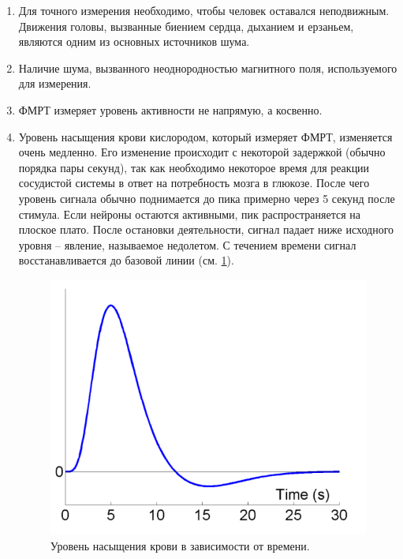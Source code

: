 \documentclass[pdftex,ptm,12pt,a4paper]{report}
\theoremstyle{definition}
\begin{document}
\begin{enumerate}
\item Для точного измерения необходимо, чтобы человек оставался неподвижным. Движения головы, вызванные биением сердца, дыханием и  ерзаньем, являются одним из основных источников шума.

\item Наличие шума, вызванного неоднородностью магнитного поля, используемого для измерения.

\item ФМРТ измеряет уровень активности не напрямую, а косвенно.

\item Уровень насыщения крови кислородом, который измеряет ФМРТ, изменяется очень медленно. Его изменение происходит с некоторой задержкой (обычно порядка пары секунд), так как необходимо некоторое время для реакции сосудистой системы в ответ на потребность мозга в глюкозе. После чего уровень сигнала обычно поднимается до пика примерно через 5 секунд после стимула. Если нейроны остаются активными, пик распространяется на плоское плато. После остановки деятельности, сигнал падает ниже исходного уровня -- явление, называемое недолетом. С течением времени сигнал восстанавливается до базовой линии (см. \ref{hrf}). 

\begin{figure}[h]
\includegraphics[scale=0.45]{images/hrf.png}
\centering
\caption{Уровень насыщения крови в зависимости от времени.}
\label{hrf}
\end{figure}

\end{enumerate}
\end{document}
